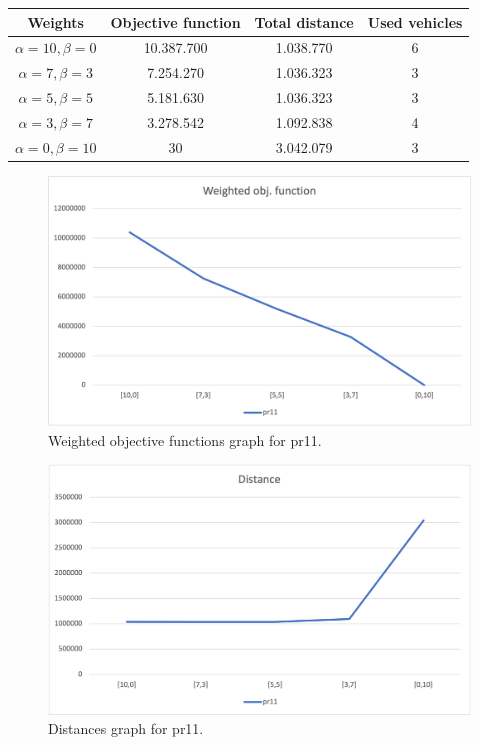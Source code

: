 {
\renewcommand{\arraystretch}{2}
\begin{longtable}[h]{| c | c | c | c |}
    \hline
    \textbf{Weights} & \textbf{Objective function} & \textbf{Total distance} & \textbf{Used vehicles} \\
    \hline
    \endhead
    $\alpha = 10, \beta = 0$ & 10.387.700 & 1.038.770 & 6 \\
    \hline
    $\alpha = 7, \beta = 3$  &  7.254.270 & 1.036.323 & 3 \\
    \hline
    $\alpha = 5, \beta = 5$  &  5.181.630 & 1.036.323 & 3 \\
    \hline
    $\alpha = 3, \beta = 7$  &  3.278.542 & 1.092.838 & 4 \\
    \hline
    $\alpha = 0, \beta = 10$ &         30 & 3.042.079 & 3 \\
    \hline
\end{longtable}
}
\begin{figure}[H]
    \centering
    \includegraphics[height=0.25\textheight]{../graphs/pr11-wobjf.png}
    \caption{Weighted objective functions graph for pr11.}
\end{figure}

\begin{figure}[H]
    \centering
    \includegraphics[height=0.25\textheight]{../graphs/pr11-distance.png}
    \caption{Distances graph for pr11.}
\end{figure}

